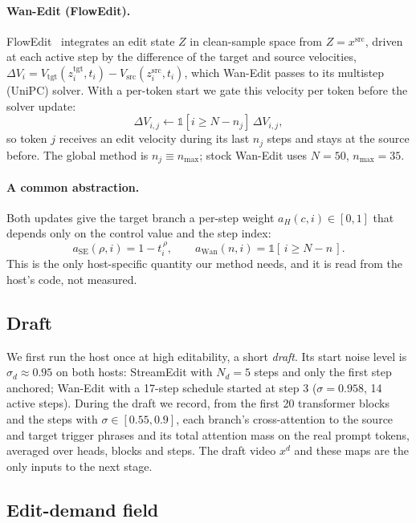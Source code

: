 \documentclass[10pt,twocolumn]{article}
\newcommand{\src}{\mathrm{src}}
\newcommand{\tgt}{\mathrm{tgt}}
\begin{document}
\paragraph{Wan-Edit (FlowEdit).}
FlowEdit~\cite{flowedit2025} integrates an edit state $Z$ in clean-sample space from $Z=x^{\src}$, driven at each active step by the difference of the target and source velocities, $\Delta V_i = V_{\tgt}(z_i^{\tgt},t_i)-V_{\src}(z_i^{\src},t_i)$, which Wan-Edit passes to its multistep (UniPC) solver. With a per-token start we gate this velocity per token before the solver update:
\begin{equation}
\Delta V_{i,j} \leftarrow \mathbb{1}\!\left[i \ge N - n_j\right]\,\Delta V_{i,j},
\label{eq:wan-gate}
\end{equation}
so token $j$ receives an edit velocity during its last $n_j$ steps and stays at the source before. The global method is $n_j\equiv n_{\max}$; stock Wan-Edit uses $N=50$, $n_{\max}=35$.

\paragraph{A common abstraction.}
Both updates give the target branch a per-step weight $a_H(c,i)\in[0,1]$ that depends only on the control value and the step index:
\begin{equation}
a_{\mathrm{SE}}(\rho,i) = 1 - t_i^{\,\rho}, \qquad a_{\mathrm{Wan}}(n,i) = \mathbb{1}[\,i \ge N-n\,].
\label{eq:coef}
\end{equation}
This is the only host-specific quantity our method needs, and it is read from the host's code, not measured.

\subsection{Draft}
\label{sec:draft}
We first run the host once at high editability, a short \emph{draft}. Its start noise level is $\sigma_d\approx 0.95$ on both hosts: StreamEdit with $N_d=5$ steps and only the first step anchored; Wan-Edit with a 17-step schedule started at step 3 ($\sigma=0.958$, 14 active steps). During the draft we record, from the first 20 transformer blocks and the steps with $\sigma\in[0.55,0.9]$, each branch's cross-attention to the source and target trigger phrases and its total attention mass on the real prompt tokens, averaged over heads, blocks and steps. The draft video $x^{d}$ and these maps are the only inputs to the next stage.

\subsection{Edit-demand field}
\label{sec:demand}
\end{document}
